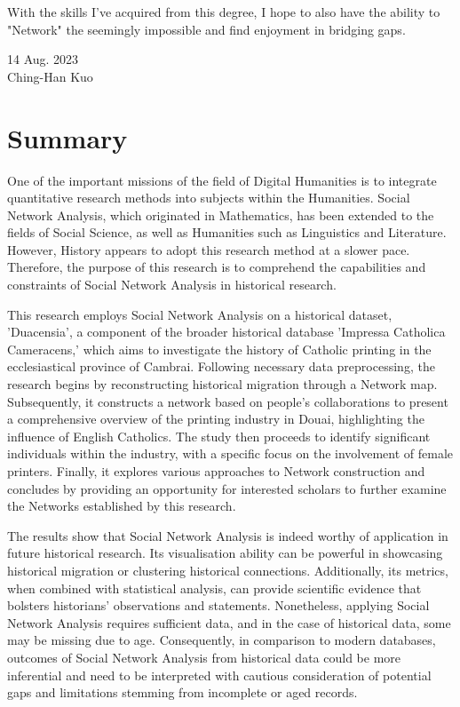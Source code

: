 \documentclass[12pt,a4paper,oneside]{book}
\begin{document}
\begin{sloppypar}
With the skills I've acquired from this degree, I hope to also have the ability to "Network" the seemingly impossible and find enjoyment in bridging gaps.
\\

\noindent
\begin{flushright}
14 Aug. 2023
\\
\noindent
Ching-Han Kuo
\end{flushright}

\chapter*{Summary}
\label{summary}
One of the important missions of the field of Digital Humanities is to integrate quantitative research methods into subjects within the Humanities. Social Network Analysis, which originated in Mathematics, has been extended to the fields of Social Science, as well as Humanities such as Linguistics and Literature. However, History appears to adopt this research method at a slower pace. Therefore, the purpose of this research is to comprehend the capabilities and constraints of Social Network Analysis in historical research.

This research employs Social Network Analysis on a historical dataset, 'Duacensia', a component of the broader historical database 'Impressa Catholica Cameracens,' which aims to investigate the history of Catholic printing in the ecclesiastical province of Cambrai. Following necessary data preprocessing, the research begins by reconstructing historical migration through a Network map. Subsequently, it constructs a network based on people's collaborations to present a comprehensive overview of the printing industry in Douai, highlighting the influence of English Catholics. The study then proceeds to identify significant individuals within the industry, with a specific focus on the involvement of female printers. Finally, it explores various approaches to Network construction and concludes by providing an opportunity for interested scholars to further examine the Networks established by this research.

The results show that Social Network Analysis is indeed worthy of application in future historical research. Its visualisation ability can be powerful in showcasing historical migration or clustering historical connections. Additionally, its metrics, when combined with statistical analysis, can provide scientific evidence that bolsters historians' observations and statements. Nonetheless, applying Social Network Analysis requires sufficient data, and in the case of historical data, some may be missing due to age. Consequently, in comparison to modern databases, outcomes of Social Network Analysis from historical data could be more inferential and need to be interpreted with cautious consideration of potential gaps and limitations stemming from incomplete or aged records.


\end{sloppypar}
\end{document}
